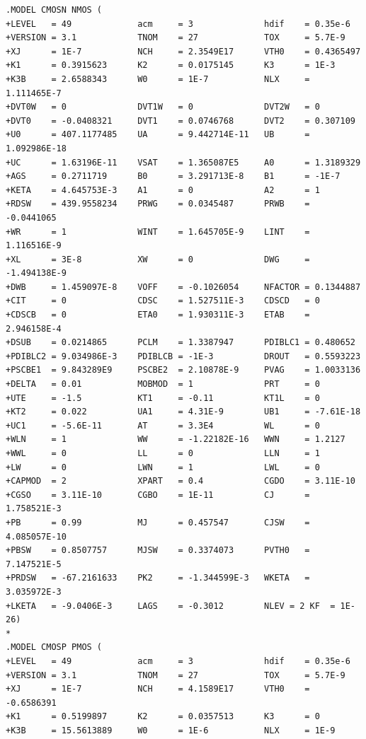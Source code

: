 \documentclass[12pt]{article}
\begin{document}
\begin{lstlisting}
.MODEL CMOSN NMOS (
+LEVEL   = 49             acm     = 3              hdif    = 0.35e-6
+VERSION = 3.1            TNOM    = 27             TOX     = 5.7E-9
+XJ      = 1E-7           NCH     = 2.3549E17      VTH0    = 0.4365497
+K1      = 0.3915623      K2      = 0.0175145      K3      = 1E-3
+K3B     = 2.6588343      W0      = 1E-7           NLX     = 1.111465E-7
+DVT0W   = 0              DVT1W   = 0              DVT2W   = 0
+DVT0    = -0.0408321     DVT1    = 0.0746768      DVT2    = 0.307109
+U0      = 407.1177485    UA      = 9.442714E-11   UB      = 1.092986E-18
+UC      = 1.63196E-11    VSAT    = 1.365087E5     A0      = 1.3189329
+AGS     = 0.2711719      B0      = 3.291713E-8    B1      = -1E-7
+KETA    = 4.645753E-3    A1      = 0              A2      = 1
+RDSW    = 439.9558234    PRWG    = 0.0345487      PRWB    = -0.0441065
+WR      = 1              WINT    = 1.645705E-9    LINT    = 1.116516E-9
+XL      = 3E-8           XW      = 0              DWG     = -1.494138E-9
+DWB     = 1.459097E-8    VOFF    = -0.1026054     NFACTOR = 0.1344887
+CIT     = 0              CDSC    = 1.527511E-3    CDSCD   = 0
+CDSCB   = 0              ETA0    = 1.930311E-3    ETAB    = 2.946158E-4
+DSUB    = 0.0214865      PCLM    = 1.3387947      PDIBLC1 = 0.480652
+PDIBLC2 = 9.034986E-3    PDIBLCB = -1E-3          DROUT   = 0.5593223
+PSCBE1  = 9.843289E9     PSCBE2  = 2.10878E-9     PVAG    = 1.0033136
+DELTA   = 0.01           MOBMOD  = 1              PRT     = 0
+UTE     = -1.5           KT1     = -0.11          KT1L    = 0
+KT2     = 0.022          UA1     = 4.31E-9        UB1     = -7.61E-18
+UC1     = -5.6E-11       AT      = 3.3E4          WL      = 0
+WLN     = 1              WW      = -1.22182E-16   WWN     = 1.2127
+WWL     = 0              LL      = 0              LLN     = 1
+LW      = 0              LWN     = 1              LWL     = 0
+CAPMOD  = 2              XPART   = 0.4            CGDO    = 3.11E-10
+CGSO    = 3.11E-10       CGBO    = 1E-11          CJ      = 1.758521E-3
+PB      = 0.99           MJ      = 0.457547       CJSW    = 4.085057E-10
+PBSW    = 0.8507757      MJSW    = 0.3374073      PVTH0   = 7.147521E-5
+PRDSW   = -67.2161633    PK2     = -1.344599E-3   WKETA   = 3.035972E-3
+LKETA   = -9.0406E-3     LAGS    = -0.3012        NLEV = 2	KF	= 1E-26)
*
.MODEL CMOSP PMOS (
+LEVEL   = 49             acm     = 3              hdif    = 0.35e-6
+VERSION = 3.1            TNOM    = 27             TOX     = 5.7E-9
+XJ      = 1E-7           NCH     = 4.1589E17      VTH0    = -0.6586391
+K1      = 0.5199897      K2      = 0.0357513      K3      = 0
+K3B     = 15.5613889     W0      = 1E-6           NLX     = 1E-9

\end{lstlisting}
\end{document}
